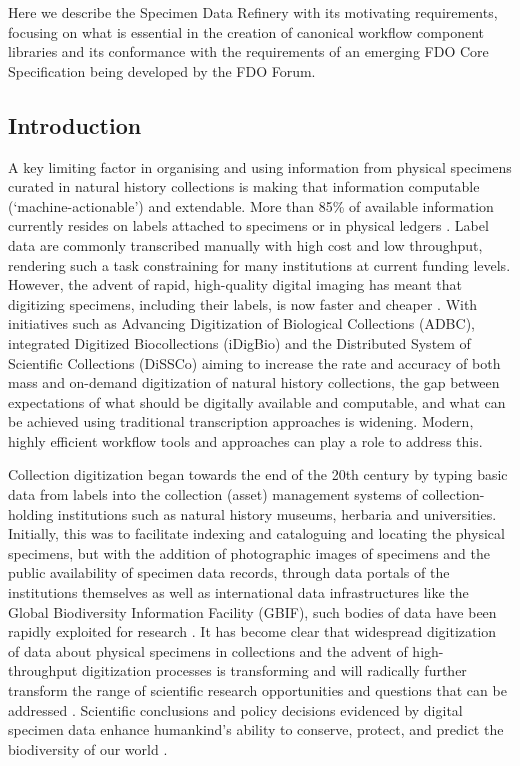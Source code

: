Here we describe the Specimen Data Refinery with its motivating
requirements, focusing on what is essential in the creation of canonical
workflow component libraries and its conformance with the requirements
of an emerging FDO Core Specification being developed by the FDO Forum.

\subsection{Introduction}\label{introduction-2}

A key limiting factor in organising and using information from physical
specimens curated in natural history collections is making that
information computable (`machine-actionable') and extendable. More than
85\% of available information currently resides on labels attached to
specimens or in physical ledgers \cite{Walton 2020}. Label data are commonly
transcribed manually with high cost and low throughput, rendering such a
task constraining for many institutions at current funding levels.
However, the advent of rapid, high-quality digital imaging has meant
that digitizing specimens, including their labels, is now faster and
cheaper \cite{ch8-2}. With initiatives such as Advancing Digitization of
Biological Collections (ADBC), integrated Digitized Biocollections
(iDigBio) and the Distributed System of Scientific Collections (DiSSCo)
\cite{ch8-3,ch8-4,ch8-5,ch8-6} aiming to increase the rate and accuracy of both mass and
on-demand digitization of natural history collections, the gap between
expectations of what should be digitally available and computable, and
what can be achieved using traditional transcription approaches is
widening. Modern, highly efficient workflow tools and approaches can
play a role to address this.

Collection digitization began towards the end of the 20th century by
typing basic data from labels into the collection (asset) management
systems of collection-holding institutions such as natural history
museums, herbaria and universities. Initially, this was to facilitate
indexing and cataloguing and locating the physical specimens, but with
the addition of photographic images of specimens and the public
availability of specimen data records, through data portals of the
institutions themselves as well as international data infrastructures
like the Global Biodiversity Information Facility (GBIF), such bodies of
data have been rapidly exploited for research \cite{ch8-7,ch8-8}. It has become
clear that widespread digitization of data about physical specimens in
collections and the advent of high-throughput digitization processes
\cite{ch8-9,ch8-10,ch8-11,ch8-12,ch8-13} is transforming and will radically further transform the
range of scientific research opportunities and questions that can be
addressed \cite{ch8-14,ch8-15}. Scientific conclusions and policy decisions
evidenced by digital specimen data enhance humankind's ability to
conserve, protect, and predict the biodiversity of our world
\cite{ch8-16,ch8-17}.

